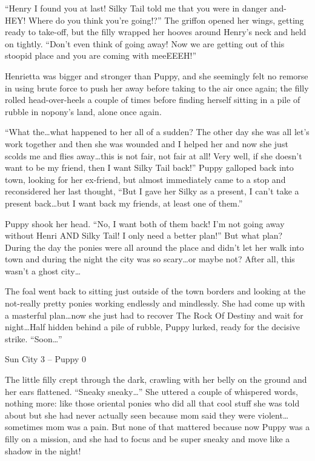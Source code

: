 ``Henry I found you at last! Silky Tail told me that you were in danger and- HEY! Where do you think you're going!?'' The griffon opened her wings, getting ready to take-off, but the filly wrapped her hooves around Henry's neck and held on tightly. ``Don't even think of going away! Now we are getting out of this stoopid place and you are coming with meeEEEH!''

Henrietta was bigger and stronger than Puppy, and she seemingly felt no remorse in using brute force to push her away before taking to the air once again; the filly rolled head-over-heels a couple of times before finding herself sitting in a pile of rubble in nopony's land, alone once again.

``What the\dots what happened to her all of a sudden? The other day she was all let's work together and then she was wounded and I helped her and now she just scolds me and flies away\dots this is not fair, not fair at all! Very well, if she doesn't want to be my friend, then I want Silky Tail back!'' Puppy galloped back into town, looking for her ex-friend, but almost immediately came to a stop and reconsidered her last thought, ``But I gave her Silky as a present, I can't take a present back\dots but I want back my friends, at least one of them.''

Puppy shook her head. ``No, I want both of them back! I'm not going away without Henri AND Silky Tail! I only need a better plan!'' But what plan? During the day the ponies were all around the place and didn't let her walk into town and during the night the city was so scary\dots or maybe not? After all, this wasn't a ghost city\dots

The foal went back to sitting just outside of the town borders and looking at the not-really pretty ponies working endlessly and mindlessly. She had come up with a masterful plan\dots now she just had to recover The Rock Of Destiny and wait for night\dots Half hidden behind a pile of rubble, Puppy lurked, ready for the decisive strike. ``Soon\dots''


\begin{center}
    Sun City 3 -- Puppy 0
\end{center}

\horizonline


The little filly crept through the dark, crawling with her belly on the ground and her ears flattened. ``Sneaky sneaky\dots'' She uttered a couple of whispered words, nothing more: like those oriental ponies who did all that cool stuff she was told about but she had never actually seen because mom said they were violent\dots sometimes mom was a pain. But none of that mattered because now Puppy was a filly on a mission, and she had to focus and be super sneaky and move like a shadow in the night!

